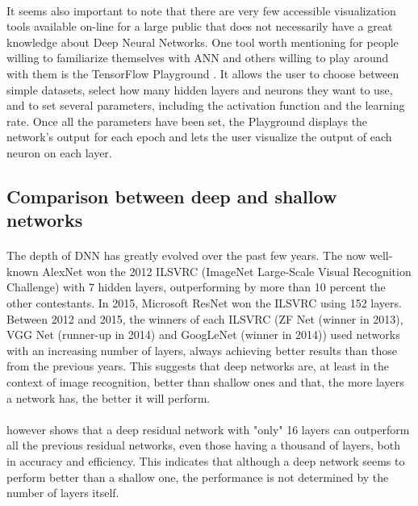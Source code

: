 \documentclass[a4paper]{article}
\begin{document}
\paragraph{}It seems also important to note that there are very few accessible visualization tools available on-line for a large public that does not necessarily have a great knowledge about Deep Neural Networks. One tool worth mentioning for people willing to familiarize themselves with ANN and others willing to play around with them is the TensorFlow Playground \citep{TFPlayground}. It allows the user to choose between simple datasets, select how many hidden layers and neurons they want to use, and to set several parameters, including the activation function and the learning rate. Once all the parameters have been set, the Playground displays the network's output for each epoch and lets the user visualize the output of each neuron on each layer.

\subsection{Comparison between deep and shallow networks}
\paragraph{}The depth of DNN has greatly evolved over the past few years. The now well-known AlexNet \citep{Krizhevsky2017} won the 2012 ILSVRC (ImageNet Large-Scale Visual Recognition Challenge) with 7 hidden layers, outperforming by more than 10 percent the other contestants. In 2015, Microsoft ResNet \citep{He2016} won the ILSVRC using 152 layers. Between 2012 and 2015, the winners of each ILSVRC (ZF Net \citep{Zeiler2014} (winner in 2013), VGG Net \citep{Simonyan2015} (runner-up in 2014) and GoogLeNet \citep{Szegedy2015} (winner in 2014)) used networks with an increasing number of layers, always achieving better results than those from the previous years. This suggests that deep networks are, at least in the context of image recognition, better than shallow ones and that, the more layers a network has, the better it will perform. 

\paragraph{}\citep{Zagoruyko2016} however shows that a deep residual network with "only" 16 layers can outperform all the previous residual networks, even those having a thousand of layers, both in accuracy and efficiency. This indicates that although a deep network seems to perform better than a shallow one, the performance is not determined by the number of layers itself.
\end{document}
